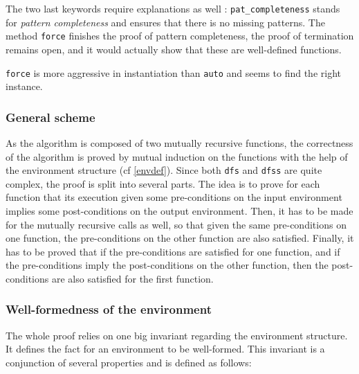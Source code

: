 \documentclass[a4 paper, 12pt]{article}
\theoremstyle{definition}
\begin{document}
The two last keywords require explanations as well : \texttt{pat\_completeness} stands for \textit{pattern completeness} and ensures that there is no missing patterns. The method \texttt{force} finishes the proof of pattern completeness, the proof of termination remains open, and it would actually show that these are well-defined functions. {\texttt{force} is more aggressive in instantiation than \texttt{auto} and seems to find the right instance.

\subsubsection{General scheme}
As the algorithm is composed of two mutually recursive functions, the correctness of the algorithm is proved by mutual induction on the functions with the help of the environment structure (cf \ref{envdef}). Since both \texttt{dfs} and \texttt{dfss} are quite complex, the proof is split into several parts. The idea is to prove for each function that its execution given some pre-conditions on the input environment implies some post-conditions on the output environment. Then, it has to be made for the mutually recursive calls as well, so that given the same pre-conditions on one function, the pre-conditions on the other function are also satisfied. Finally, it has to be proved that if the pre-conditions are satisfied for one function, and if the pre-conditions imply the post-conditions on the other function, then the post-conditions are also satisfied for the first function.

\subsubsection{Well-formedness of the environment}
The whole proof relies on one big invariant regarding the environment structure. It defines the fact for an environment to be well-formed. This invariant is a conjunction of several properties and is defined as follows:

}
\end{document}
